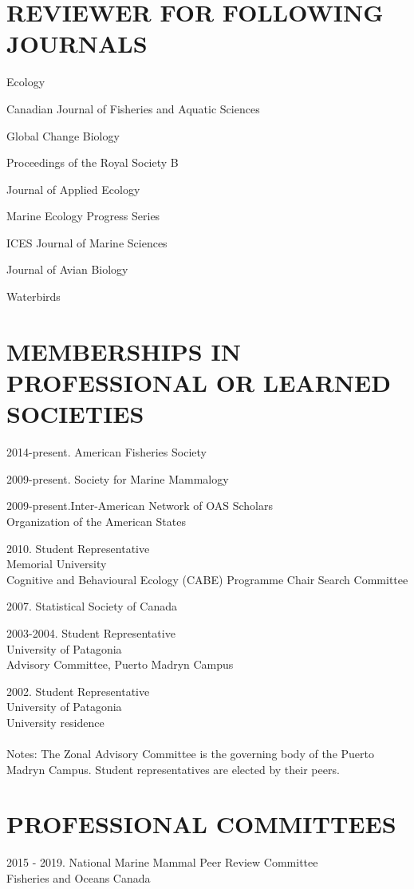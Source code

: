 \documentclass{res}
\begin{document}
\begin{resume}
\section{REVIEWER FOR FOLLOWING JOURNALS}
\vspace{0.2in}
Ecology

Canadian Journal of Fisheries and Aquatic Sciences

Global Change Biology

Proceedings of the Royal Society B

Journal of Applied Ecology

Marine Ecology Progress Series

ICES Journal of Marine Sciences

Journal of Avian Biology

Waterbirds


\section{MEMBERSHIPS IN PROFESSIONAL OR LEARNED SOCIETIES}
\vspace{0.2in}
\begin{hangparas}{.4in}{1}
2014-present. American Fisheries Society

2009-present. Society for Marine Mammalogy    

2009-present.Inter-American Network of OAS Scholars     \\
Organization of the American States

2010. Student Representative\\
Memorial University\\
Cognitive and Behavioural Ecology (CABE) Programme Chair Search Committee

2007. Statistical Society of Canada

2003-2004. Student Representative\\
University of Patagonia\\
Advisory Committee, Puerto Madryn Campus

2002. Student Representative\\
University of Patagonia\\
University residence\\~\\
Notes: The Zonal Advisory Committee is the governing body of the Puerto Madryn Campus. 
Student representatives are elected by their peers.

\end{hangparas}
\section{PROFESSIONAL COMMITTEES}
\vspace{0.2in}
\begin{hangparas}{.4in}{1}
2015 - 2019. National Marine Mammal Peer Review Committee\\
Fisheries and Oceans Canada


\end{hangparas}
\end{resume}
\end{document}
